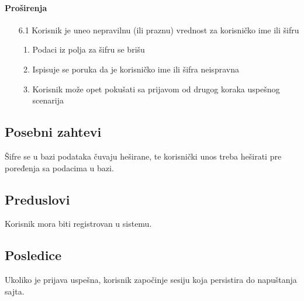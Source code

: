 \documentclass[a4paper,12pt]{report}
\begin{document}
			\paragraph*{Proširenja}
				\begin{enumerate}
					\item[6.1] Korisnik je uneo nepravilnu (ili praznu) vrednost za korisničko ime ili šifru
						\begin{enumerate}[noitemsep,topsep=-8pt]
							\item Podaci iz polja za šifru se brišu
							\item Ispisuje se poruka da je korisničko ime ili šifra neispravna
							\item Korisnik može opet pokušati sa prijavom od drugog koraka uspešnog scenarija
						\end{enumerate}
				\end{enumerate}
		\subsection{Posebni zahtevi}
			Šifre se u bazi podataka čuvaju heširane, te korisnički unos treba heširati pre poređenja sa podacima u bazi.
		\subsection{Preduslovi}
			Korisnik mora biti registrovan u sistemu.
		\subsection{Posledice}
			Ukoliko je prijava uspešna, korisnik započinje sesiju koja persistira do napuštanja sajta.
\end{document}
